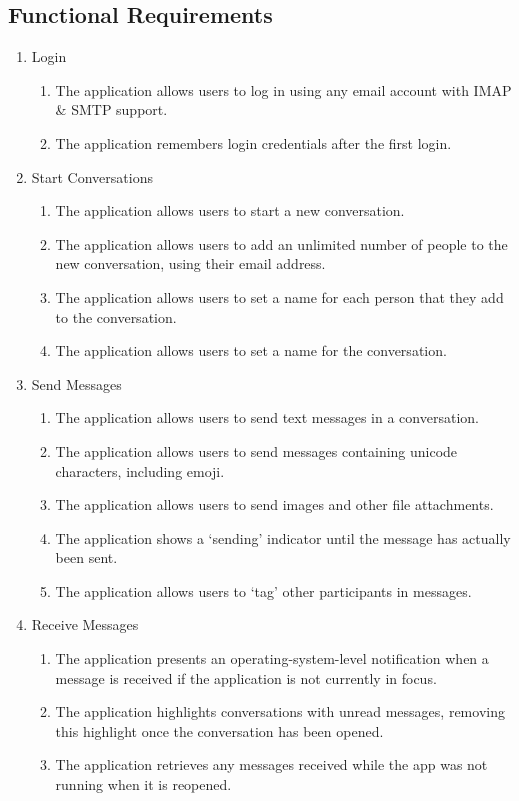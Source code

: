 \subsection{Functional Requirements}\label{sec:functional-requirements}
\renewcommand{\labelenumii}{\theenumii}
\renewcommand{\theenumii}{\theenumi.\arabic{enumii}.}
\begin{enumerate}
  \item Login
  \begin{enumerate}
    \item The application allows users to log in using any email account with IMAP \& SMTP support.
    \item The application remembers login credentials after the first login.
  \end{enumerate}

  \item Start Conversations
  \begin{enumerate}
    \item The application allows users to start a new conversation.
    \item The application allows users to add an unlimited number of people to the new conversation, using their email address.
    \item The application allows users to set a name for each person that they add to the conversation.
    \item The application allows users to set a name for the conversation.
  \end{enumerate}

  \item Send Messages
  \begin{enumerate}
    \item The application allows users to send text messages in a conversation.
    \item The application allows users to send messages containing unicode characters, including emoji.
    \item The application allows users to send images and other file attachments.
    \item The application shows a `sending' indicator until the message has actually been sent.
    \item The application allows users to `tag' other participants in messages.
  \end{enumerate}

  \item Receive Messages
  \begin{enumerate}
    \item The application presents an operating-system-level notification when a message is received if the application is not currently in focus.
    \item The application highlights conversations with unread messages, removing this highlight once the conversation has been opened.
    \item The application retrieves any messages received while the app was not running when it is reopened.
  \end{enumerate}
  

\end{enumerate}
